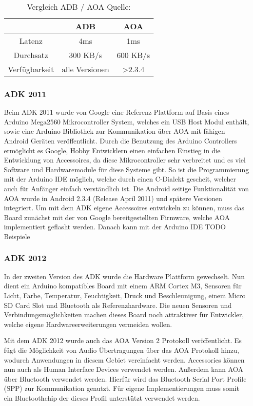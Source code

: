 \documentclass[12pt,journal,compsoc]{IEEEtran}
\begin{document}
\begin{table}
	\centering
	\caption{Vergleich ADB / AOA Quelle: \cite{comp}}
	\label{table:vergl}
	\begin{tabular}{c | c | c}
		& ADB & AOA \\ \hline
		Latenz & 4ms & 1ms \\ \hline
		Durchsatz & 300 KB/s & 600 KB/s \\ \hline
		Verfügbarkeit & alle Versionen & \textgreater 2.3.4 \\ \hline
	\end{tabular}
\end{table}


\subsubsection{ADK 2011}
Beim ADK 2011 wurde von Google eine
Referenz Plattform auf Basis eines Arduino Mega2560 Mikrocontroller System, welches ein USB Host Modul enthält, sowie eine Arduino Bibliothek zur Kommunikation über AOA mit fähigen Android Geräten veröffentlicht.
Durch die Benutzung des Arduino Controllers ermöglicht es Google, Hobby Entwicklern einen einfachen Einstieg in die Entwicklung von Accessoires, da diese Mikrocontroller sehr verbreitet und es viel Software und Hardwaremodule für diese Systeme gibt.
So ist die Programmierung mit der Arduino IDE möglich, welche durch einen C-Dialekt gescheit, welcher auch für Anfänger einfach verständlich ist.
Die Android seitige Funktionalität von AOA wurde in Android 2.3.4 (Release April 2011) und spätere Versionen integriert. 
Um mit dem ADK eigene Accessoires entwickeln zu können, muss das Board zunächst mit der von Google bereitgestellten Firmware, welche AOA implementiert geflasht werden.
Danach kann mit der Arduino IDE 
TODO Beispiele
\subsubsection{ADK 2012}
In der zweiten Version des ADK wurde die Hardware Plattform gewechselt. Nun dient ein Arduino kompatibles Board mit einem ARM Cortex M3, Sensoren für Licht, Farbe, Temperatur, Feuchtigkeit, Druck und Beschleunigung, einem Micro SD Card Slot und Bluetooth als Referenzhardware.
Die neuen Sensoren und Verbindungsmöglichkeiten machen dieses Board noch attraktiver für Entwickler, welche eigene Hardwareerweiterungen vermeiden wollen.

Mit dem ADK 2012 wurde auch das AOA Version 2 Protokoll veröffentlicht.
Es fügt die Möglichkeit von Audio Übertragungen über das AOA Protokoll hinzu, wodurch Anwendungen in diesem Gebiet vereinfacht werden.
Accessories können nun auch als Human Interface Devices verwendet werden.
Außerdem kann AOA über Bluetooth verwendet werden. Hierfür wird das Bluetooth Serial Port Profile (SPP) zur Kommunikation genutzt. Für eigene Implementierungen muss somit ein Bluetoothchip der dieses Profil unterstützt verwendet werden.
\end{document}

